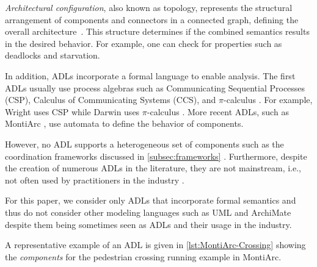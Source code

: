 \documentclass[runningheads]{llncs}
\begin{document}
\textit{Architectural configuration}, also known as topology, represents the structural arrangement of components and connectors in a connected graph, defining the overall architecture~\cite{medvidovicClassificationComparisonFramework2000}.
This structure determines if the combined semantics results in the desired behavior.
For example, one can check for properties such as deadlocks and starvation.

In addition, ADLs incorporate a formal language to enable analysis.
The first ADLs usually use process algebras such as Communicating Sequential Processes (CSP), Calculus of Communicating Systems (CCS), and $\pi$-calculus \cite{ozkayaAreWeThere2013}.
For example, Wright uses CSP \cite{allenFormalBasisArchitectural1997} while Darwin uses $\pi$-calculus \cite{mageeSpecifyingDistributedSoftware1995}.
More recent ADLs, such as MontiArc \cite{haberMontiArcArchitecturalModeling2014}, use automata to define the behavior of components.

However, no ADL supports a heterogeneous set of components such as the coordination frameworks discussed in \autoref{subsec:frameworks} \cite{medvidovicClassificationComparisonFramework2000}.
Furthermore, despite the creation of numerous ADLs in the literature, they are not mainstream, i.e., not often used by practitioners in the industry \cite{clementsSurveyArchitectureDescription1996,woodsArchitectureDescriptionLanguages2005,pandeyArchitecturalDescriptionLanguages2010,ozkayaAreWeThere2013,medvidovicMovingArchitecturalDescription2006}.

For this paper, we consider only ADLs that incorporate formal semantics and thus do not consider other modeling languages such as UML \cite{objectmanagementgroupUnifiedModelingLanguage2017} and ArchiMate \cite{theopengroupArchiMateSpecification2023} despite them being sometimes seen as ADLs and their usage in the industry.

A representative example of an ADL is given in  \autoref{lst:MontiArc-Crossing} showing the \textit{components} for the pedestrian crossing running example in MontiArc.


\end{document}
